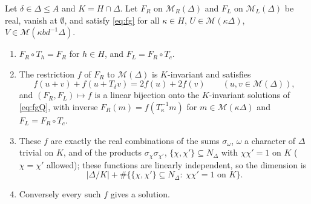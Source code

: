 \begin{theorem}\label{thm:fgsolve}
Let $\delta\in\Delta\le A$ and $K=H\cap\Delta$. Let $F_R$ on $\mathcal{M}_R(\Delta)$ and $F_L$ on $\mathcal{M}_L(\Delta)$ be real, vanish at $\emptyset$, and satisfy \eqref{eq:fg} for all $\kappa\in H$, $U\in\mathcal{M}(\kappa\Delta)$, $V\in\mathcal{M}(\kappa bd^{-1}\Delta)$.
\begin{enumerate}[label=(\roman*)]
\item $F_R\circ T_h=F_R$ for $h\in H$, and $F_L=F_R\circ T_c$.
\item The restriction $f$ of $F_R$ to $\mathcal{M}(\Delta)$ is $K$-invariant and satisfies
\begin{equation}\label{eq:fgQ}
f(u+v)+f(u+T_\delta v)=2f(u)+2f(v)\qquad(u,v\in\mathcal{M}(\Delta)),
\end{equation}
and $(F_R,F_L)\mapsto f$ is a linear bijection onto the $K$-invariant solutions of \eqref{eq:fgQ}, with inverse $F_R(m)=f(T_{\kappa}^{-1}m)$ for $m\in\mathcal{M}(\kappa\Delta)$ and $F_L=F_R\circ T_c$.
\item These $f$ are exactly the real combinations of the sums $\sigma_\omega$, $\omega$ a character of $\Delta$ trivial on $K$, and of the products $\sigma_\chi\sigma_{\chi'}$, $\{\chi,\chi'\}\subseteq N_\Delta$ with $\chi\chi'=1$ on $K$ ($\chi=\chi'$ allowed); these functions are linearly independent, so the dimension is
\[
|\Delta/K|+\#\bigl\{\{\chi,\chi'\}\subseteq N_\Delta:\ \chi\chi'=1\text{ on }K\bigr\}.
\]
\item Conversely every such $f$ gives a solution.
\end{enumerate}
\end{theorem}
